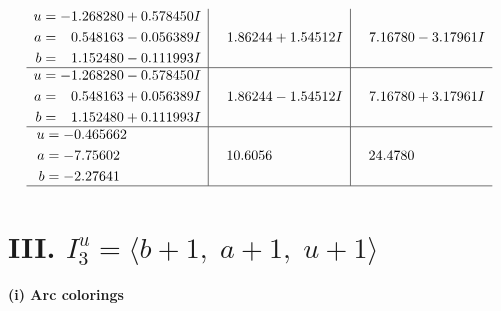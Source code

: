 \documentclass[1p]{elsarticle_modified}
\theoremstyle{definition}
\begin{document}
$$\begin{array}{c|c|c}
\begin{aligned}
u &= -1.268280 + 0.578450 I \\
a &= \phantom{-}0.548163 - 0.056389 I \\
b &= \phantom{-}1.152480 - 0.111993 I\end{aligned}
 & \phantom{-}1.86244 + 1.54512 I & \phantom{-}7.16780 - 3.17961 I \\ \hline\begin{aligned}
u &= -1.268280 - 0.578450 I \\
a &= \phantom{-}0.548163 + 0.056389 I \\
b &= \phantom{-}1.152480 + 0.111993 I\end{aligned}
 & \phantom{-}1.86244 - 1.54512 I & \phantom{-}7.16780 + 3.17961 I \\ \hline\begin{aligned}
u &= -0.465662\phantom{ +0.000000I} \\
a &= -7.75602\phantom{ +0.000000I} \\
b &= -2.27641\phantom{ +0.000000I}\end{aligned}
 & \phantom{-}10.6056\phantom{ +0.000000I} & \phantom{-}24.4780\phantom{ +0.000000I}\\
 \hline 
 \end{array}$$\newpage\newpage\renewcommand{\arraystretch}{1}
\centering \section*{III. $I^u_{3}= \langle b+1,\;a+1,\;u+1 \rangle$}
\flushleft \textbf{(i) Arc colorings}\\
\end{document}
